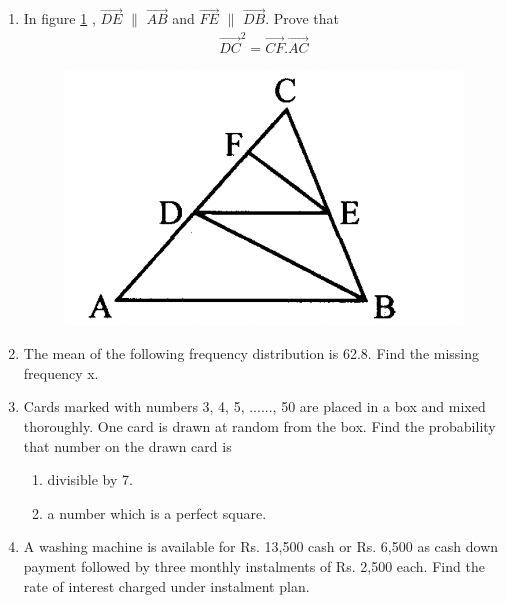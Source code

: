 \documentclass[journal,12pt,twocolumn]{IEEEtran}
\renewcommand\thesection{\arabic{section}}
\begin{document}
\begin{enumerate}[label=\thesection.\arabic*.,ref=\thesection.\theenumi]
\item In figure \ref{fig4} , $\vec{DE} $ $\|$ $\vec{AB} $ and $\vec{FE} $ $\|$ $\vec{DB} $. Prove that 
\begin{align}
\vec{DC}^2=\vec{CF}.\vec{AC} \nonumber
\end{align}
\begin{figure}[h!]
	\centering
    \includegraphics[width=0.5\columnwidth,center]{./fig/4.png}
    \caption{}
    \label{fig4}
\end{figure}
 \item The mean of the following frequency distribution is 62.8. Find the missing frequency x.
\\
\begin{table}[ht]
 \centering
 \caption{}
 \end{table}
 
\item Cards marked with numbers 3, 4, 5, ......, 50 are placed in a box and mixed thoroughly. One card is drawn at random from the box. Find the probability that number on the drawn card is
\begin{enumerate}
\item divisible by 7.
\item a number which is a perfect square.
\end{enumerate}
 
\item A washing machine is available for Rs. 13,500 cash or Rs. 6,500 as cash down payment followed by three monthly instalments of Rs. 2,500 each. Find the rate of interest charged under instalment plan.
\end{enumerate}
\end{document}

